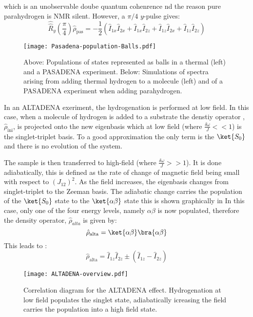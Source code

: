 which is an unobservable doube quantum cohenrence nd the reason pure parahydrogen is NMR silent. However,
a $\pi/4$ $y$-pulse gives:
\begin{equation}
\hat{\hat{R}}_y(\frac{\pi}{4})\hat{\rho}_{\text{pas}} = -\frac{1}{2}(\hat{I}_{1x}\hat{I}_{2x} + \hat{I}_{1x}\hat{I}_{2z} + \hat{I}_{1z}\hat{I}_{2x} + \hat{I}_{1z}\hat{I}_{2z})
\end{equation}

\begin{figure*}
  \begin{center}
  \texttt{[image: Pasadena-population-Balls.pdf]}
  \end{center}
  \caption{Above: Populations of states represented as balls in a thermal (left) and a PASADENA experiment. Below: Simulations of spectra arising from adding thermal hydrogen to a molecule (left) and of a PASADENA experiment when adding parahydrogen.}
  \label{fig:PASADENA}
\end{figure*}

In an ALTADENA exeriment, the hydrogenation is performed at low field. In this case, when a molecule of hydrogen
is added to a substrate the denstiy operator ,$\hat{\rho}_\text{ini}$, is projected onto the new eigenbasis which
at low field (where $\frac{\delta{\omega}}{J}<<1$) is the singlet-triplet basis. To a good approximation the only term is the $\ket{S_0}$ and there is no evolution of the system.

The sample is then transferred to high-field (where $\frac{\delta{\omega}}{J}>>1$). It is done adiabatically, this is defined as the rate of change of magnetic field being small with respect to $(J_{12})^2$. As the field increases, the eigenbasis changes from singlet-triplet to the Zeeman basis. The adiabatic change carries the population of the $\ket{S_0}$ state to the $\ket{\alpha\beta}$ state this is shown graphically in  In this case, only one of the four energy levels, namely $\alpha\beta$ is now populated, therefore the density operator, $\hat{\rho}_{alta}$ is given by:
\begin{equation}
  \hat{\rho}_{\text{alta}} = \ket{\alpha\beta}\bra{\alpha\beta}
\end{equation}
 This leads to \citep{RN128}:
\begin{equation}
  \hat{\rho}_{\text{alta}} = \hat{I}_{1z}\hat{I}_{2z}±(\hat{I}_{1z}-\hat{I}_{2z})
\end{equation}

\begin{figure}
  \begin{center}
  \texttt{[image: ALTADENA-overview.pdf]}
  \end{center}
  \caption{Correlation diagram for the ALTADENA effect. Hydrogenation at low field populates the singlet state, adiabatically icreasing the field carries the population into a high field state.}
  \label{fig:SingletTriplet}
\end{figure}

